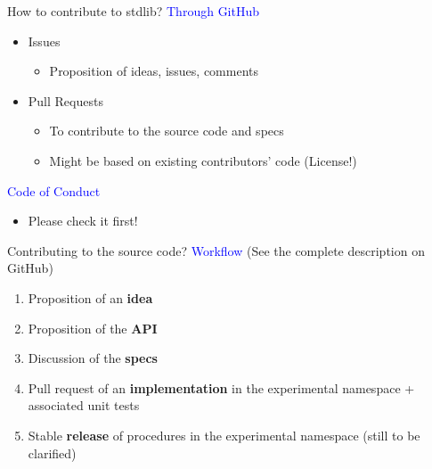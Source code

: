 \documentclass{beamer}
\begin{document}
\begin{frame}[c]{How to contribute to stdlib?}
	\textcolor{blue}{Through GitHub}\\
	\begin{itemize}
		\item \textcolor{mygreen}{Issues}
		\begin{itemize}
			\item Proposition of ideas, issues, comments
		\end{itemize}
		\item \textcolor{mygreen}{Pull Requests}
		\begin{itemize}
			\item To contribute to the source code and specs
			\item Might be based on existing contributors' code (License!)
		\end{itemize}
	\end{itemize}
	\textcolor{blue}{Code of Conduct}\\
	\begin{itemize}
		\item Please check it first!
	\end{itemize}
\end{frame}

\begin{frame}[c]{Contributing to the source code?}
	\textcolor{blue}{Workflow} (See the complete description on GitHub)
	\begin{enumerate}
		\item Proposition of an \textbf{idea}
		\item Proposition of the \textbf{API}
		\item Discussion of the \textbf{specs}
		\item Pull request of an \textbf{implementation} in the experimental namespace + associated unit tests
		\item Stable \textbf{release} of procedures in the experimental namespace (still to be clarified)
	\end{enumerate}
\end{frame}
\end{document}

